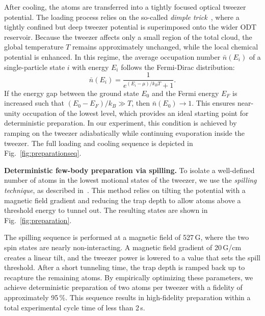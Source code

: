 After cooling, the atoms are transferred into a tightly focused optical tweezer potential. The loading process relies on the so-called \emph{dimple trick}~\cite{zurn_few-fermion_2012}, where a tightly confined but deep tweezer potential is superimposed onto the wider ODT reservoir. Because the tweezer affects only a small region of the total cloud, the global temperature $T$ remains approximately unchanged, while the local chemical potential is enhanced. In this regime, the average occupation number $\bar{n}(E_i)$ of a single-particle state $i$ with energy $E_i$ follows the Fermi-Dirac distribution:
\begin{equation}
    \bar{n}(E_i) = \frac{1}{e^{(E_i - \mu)/k_B T} + 1}.
\end{equation}
If the energy gap between the ground state $E_0$ and the Fermi energy $E_F$ is increased such that $(E_0 - E_F) / k_B \gg T$, then $\bar{n}(E_0) \rightarrow 1$. This ensures near-unity occupation of the lowest level, which provides an ideal starting point for deterministic preparation. In our experiment, this condition is achieved by ramping on the tweezer adiabatically while continuing evaporation inside the tweezer. The full loading and cooling sequence is depicted in Fig.~\ref{fig:preparationseq}.

\textbf{Deterministic few-body preparation via spilling.} To isolate a well-defined number of atoms in the lowest motional states of the tweezer, we use the \emph{spilling technique}, as described in~\cite{zurn_few-fermion_2012, holten_pauli_2022}. This method relies on tilting the potential with a magnetic field gradient and reducing the trap depth to allow atoms above a threshold energy to tunnel out. 
The resulting states are shown in Fig.~\ref{fig:preparation}. 

The spilling sequence is performed at a magnetic field of 527\,G, where the two spin states are nearly non-interacting. A magnetic field gradient of 20\,G/cm creates a linear tilt, and the tweezer power is lowered to a value that sets the spill threshold. After a short tunneling time, the trap depth is ramped back up to recapture the remaining atoms. By empirically optimizing these parameters, we achieve deterministic preparation of two atoms per tweezer with a fidelity of approximately 95\,\%. This sequence results in high-fidelity preparation within a total experimental cycle time of less than 2\,s.

